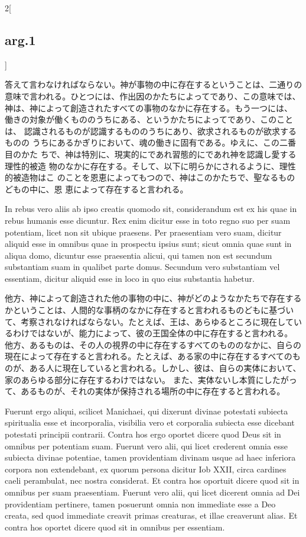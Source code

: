 \documentclass[paper=a4paper,fontsize=10pt,jafontsize=9pt,titlepage]{jlreq}
\begin{document}
\begin{paracol}{2}[\subsection{arg.1}]
\switchcolumn

答えて言わなければならない。神が事物の中に存在するということは、二通りの
意味で言われる。ひとつには、作出因のかたちによってであり、この意味では、
神は、神によって創造されたすべての事物のなかに存在する。もう一つには、
働きの対象が働くもののうちにある、というかたちによってであり、このことは、
認識されるものが認識するもののうちにあり、欲求されるものが欲求するものの
うちにあるかぎりにおいて、魂の働きに固有である。ゆえに、この二番目のかた
ちで、神は特別に、現実的にであれ習態的にであれ神を認識し愛する理性的被造
物のなかに存在する。そして、以下に明らかにされるように、理性的被造物はこ
のことを恩恵によってもつので、神はこのかたちで、聖なるものどもの中に、恩
恵によって存在すると言われる。

\switchcolumn*

In rebus vero aliis ab ipso creatis quomodo sit, considerandum est ex
 his quae in rebus humanis esse dicuntur. Rex enim dicitur esse in toto
 regno suo per suam potentiam, licet non sit ubique praesens.  Per
 praesentiam vero suam, dicitur aliquid esse in omnibus quae in
 prospectu ipsius sunt; sicut omnia quae sunt in aliqua domo, dicuntur
 esse praesentia alicui, qui tamen non est secundum substantiam suam in
 qualibet parte domus.  Secundum vero substantiam vel essentiam, dicitur
 aliquid esse in loco in quo eius substantia habetur.

\switchcolumn

他方、神によって創造された他の事物の中に、神がどのようなかたちで存在するかということは、人間的な事柄のなかに存在すると言われるものどもに基づいて、考察されなければならない。たとえば、王は、あらゆるところに現在しているわけではないが、能力によって、彼の王国全体の中に存在すると言われる。
他方、あるものは、その人の視界の中に存在するすべてのもののなかに、自らの現在によって存在すると言われる。たとえば、ある家の中に存在するすべてのものが、ある人に現在していると言われる。しかし、彼は、自らの実体において、家のあらゆる部分に存在するわけではない。
また、実体ないし本質にしたがって、あるものが、それの実体が保持される場所の中に存在すると言われる。

\switchcolumn*

Fuerunt ergo aliqui, scilicet Manichaei, qui dixerunt divinae potestati
 subiecta spiritualia esse et incorporalia, visibilia vero et corporalia
 subiecta esse dicebant potestati principii contrarii. Contra hos ergo
 oportet dicere quod Deus sit in omnibus per potentiam suam. 
Fuerunt vero alii, qui licet crederent omnia esse subiecta divinae potentiae, tamen providentiam divinam usque ad haec inferiora corpora non extendebant, ex quorum persona dicitur Iob XXII, circa cardines caeli perambulat, nec nostra considerat. Et contra hos oportuit dicere quod sit in omnibus per suam praesentiam. 
Fuerunt vero alii, qui licet dicerent omnia ad Dei providentiam
 pertinere, tamen posuerunt omnia non immediate esse a Deo creata, sed
 quod immediate creavit primas creaturas, et illae creaverunt alias. Et
 contra hos oportet dicere quod sit in omnibus per essentiam.


\end{paracol}
\end{document}

